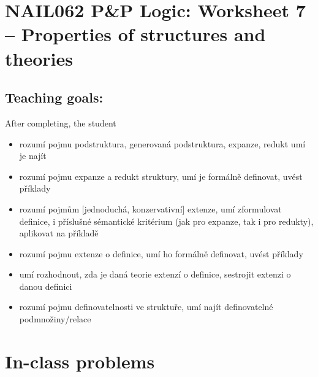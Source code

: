 \section*{NAIL062 P\&P Logic: Worksheet 7 -- Properties of structures and theories}


\subsection*{Teaching goals:} After completing, the student

    \begin{itemize}\setlength{\itemsep}{0pt}
        \item rozumí pojmu podstruktura, generovaná podstruktura, expanze, redukt umí je najít
        \item rozumí pojmu expanze a redukt struktury, umí je formálně definovat, uvést příklady
        \item rozumí pojmům [jednoduchá, konzervativní] extenze, umí zformulovat definice, i příslušné sémantické kritérium (jak pro expanze, tak i pro redukty), aplikovat na příkladě
        \item rozumí pojmu extenze o definice, umí ho formálně definovat, uvést příklady
        \item umí rozhodnout, zda je daná teorie extenzí o definice, sestrojit extenzi o danou definici
        \item rozumí pojmu definovatelnosti ve struktuře, umí najít definovatelné podmnožiny/relace
    \end{itemize}
    

\section*{In-class problems}


